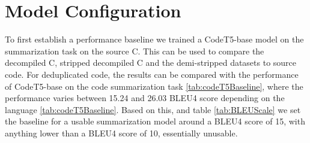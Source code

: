 
\section{Model Configuration}
To first establish a performance baseline we trained a CodeT5-base model on the summarization task on the source C. This can be used to compare the decompiled C, stripped decompiled C and the demi-stripped datasets to source code. For deduplicated code, the results can be compared with the performance of CodeT5-base on the code summarization task \ref{tab:codeT5Baseline}, where the performance varies between 15.24 and 26.03 BLEU4 score depending on the language \ref{tab:codeT5Baseline}. Based on this, and table \ref{tab:BLEUScale} we set the baseline for a usable summarization model around a BLEU4 score of 15, with anything lower than a BLEU4 score of 10, essentially unusable.


